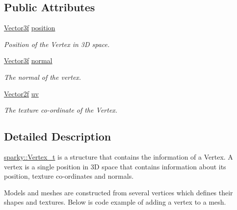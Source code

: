 \subsection*{Public Attributes}
\begin{DoxyCompactItemize}
\item 
\hyperlink{classsparky_1_1_vector3}{Vector3f} \hyperlink{structsparky_1_1_vertex__t_a451b5dfe28e6142cded4d61732f1bab5}{position}\hypertarget{structsparky_1_1_vertex__t_a451b5dfe28e6142cded4d61732f1bab5}{}\label{structsparky_1_1_vertex__t_a451b5dfe28e6142cded4d61732f1bab5}

\begin{DoxyCompactList}\small\item\em Position of the Vertex in 3D space. \end{DoxyCompactList}\item 
\hyperlink{classsparky_1_1_vector3}{Vector3f} \hyperlink{structsparky_1_1_vertex__t_ac52963418ebdb1ce5f5b211375d90b19}{normal}\hypertarget{structsparky_1_1_vertex__t_ac52963418ebdb1ce5f5b211375d90b19}{}\label{structsparky_1_1_vertex__t_ac52963418ebdb1ce5f5b211375d90b19}

\begin{DoxyCompactList}\small\item\em The normal of the vertex. \end{DoxyCompactList}\item 
\hyperlink{classsparky_1_1_vector2}{Vector2f} \hyperlink{structsparky_1_1_vertex__t_a7e97e56f9ec466f059da0887e87305c9}{uv}\hypertarget{structsparky_1_1_vertex__t_a7e97e56f9ec466f059da0887e87305c9}{}\label{structsparky_1_1_vertex__t_a7e97e56f9ec466f059da0887e87305c9}

\begin{DoxyCompactList}\small\item\em The texture co-\/ordinate of the Vertex. \end{DoxyCompactList}\end{DoxyCompactItemize}


\subsection{Detailed Description}
\hyperlink{structsparky_1_1_vertex__t}{sparky\+::\+Vertex\+\_\+t} is a structure that contains the information of a Vertex. A vertex is a single position in 3D space that contains information about it\textquotesingle{}s position, texture co-\/ordinates and normals.

Models and meshes are constructed from several vertices which defines their shapes and textures. Below is code example of adding a vertex to a mesh.

